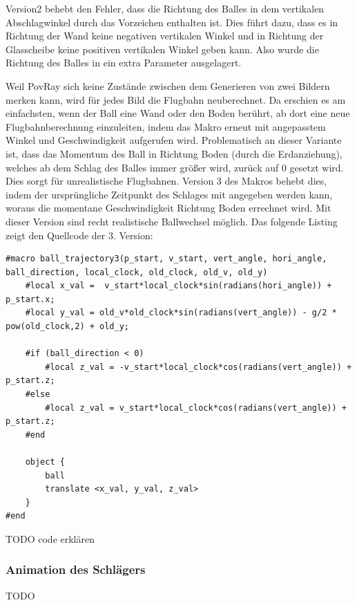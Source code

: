 Version2 behebt den Fehler, dass die Richtung des Balles in dem vertikalen Abschlagwinkel durch das Vorzeichen enthalten ist. Dies führt dazu, dass es in Richtung der Wand keine negativen vertikalen Winkel und in Richtung der Glasscheibe keine positiven vertikalen Winkel geben kann. Also wurde die Richtung des Balles in ein extra Parameter ausgelagert.

Weil PovRay sich keine Zustände zwischen dem Generieren von zwei Bildern merken kann, wird für jedes Bild die Flugbahn neuberechnet. Da erschien es am einfachsten, wenn der Ball eine Wand oder den Boden berührt, ab dort eine neue Flugbahnberechnung einzuleiten, indem das Makro erneut mit angepasstem Winkel und Geschwindigkeit aufgerufen wird. Problematisch an dieser Variante ist, dass das Momentum des Ball in Richtung Boden (durch die Erdanziehung), welches ab dem Schlag des Balles immer größer wird, zurück auf $0$ gesetzt wird. Dies sorgt für unrealistische Flugbahnen. Version 3 des Makros behebt dies, indem der ursprüngliche Zeitpunkt des Schlages mit angegeben werden kann, woraus die momentane Geschwindigkeit Richtung Boden errechnet wird. Mit dieser Version sind recht realistische Ballwechsel möglich. Das folgende Listing zeigt den Quellcode der 3. Version:\\

\begin{lstlisting}[caption="Makro zur Generierung einer Flugbahn des Balles (verkürzt)"]
#macro ball_trajectory3(p_start, v_start, vert_angle, hori_angle, ball_direction, local_clock, old_clock, old_v, old_y)
	#local x_val =  v_start*local_clock*sin(radians(hori_angle)) + p_start.x;
	#local y_val = old_v*old_clock*sin(radians(vert_angle)) - g/2 * pow(old_clock,2) + old_y;

	#if (ball_direction < 0)
		#local z_val = -v_start*local_clock*cos(radians(vert_angle)) + p_start.z;
	#else 
		#local z_val = v_start*local_clock*cos(radians(vert_angle)) + p_start.z;
	#end

	object {
		ball
		translate <x_val, y_val, z_val>
	}
#end
\end{lstlisting}
TODO code erklären

\subsubsection{Animation des Schlägers}
TODO
